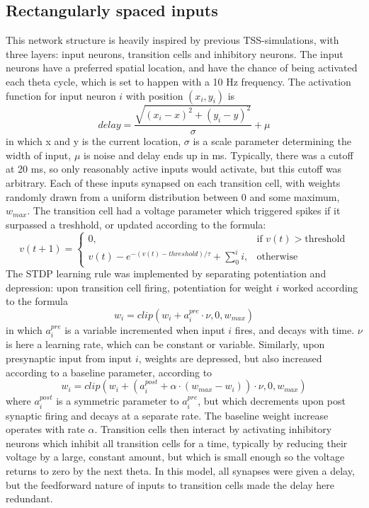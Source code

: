 \documentclass{article}
\begin{document}
    \subsection{Rectangularly spaced inputs} This network structure is heavily inspired by previous TSS-simulations, with three layers: input neurons, transition cells and inhibitory neurons. The input neurons have a preferred spatial location, and have the chance of being activated each theta cycle, which is set to happen with a 10 Hz frequency. The activation function for input neuron \(i\) with position \((x_i, y_i)\) is \begin{equation} \label{key1} delay = \frac{\sqrt{(x_i - x)^2 + (y_i - y)^2}}{\sigma} + \mu\end{equation}
    in which x and y is the current location, \(\sigma\) is a scale parameter determining the width of input, \(\mu\) is noise and delay ends up in ms. Typically, there was a cutoff at 20 ms, so only reasonably active inputs would activate, but this cutoff was arbitrary. Each of these inputs synapsed on each transition cell, with weights randomly drawn from a uniform distribution between 0 and some maximum, \(w_{max}\). The transition cell had a voltage parameter which triggered spikes if it surpassed a treshhold, or updated according to the formula: \begin{equation} \label{key2} v(t+1) =  \begin{cases} 0, & \text{if } v(t) > \text{threshold}\\ v(t) - e^{-(v(t) - threshold) / \tau} + \sum_{0}^{i} i, & \text{otherwise} \end{cases} \end{equation}
    The STDP learning rule was implemented by separating potentiation and depression: upon transition cell firing, potentiation for weight \(i\) worked according to the formula \begin{equation} \label{key3} w_i = clip(w_i + a^{pre}_i \cdot \nu, 0, w_{max})\end{equation} in which \(a^{pre}_i\) is a variable incremented when input \(i\) fires, and decays with time. \(\nu\) is here a learning rate, which can be constant or variable. 
    Similarly, upon presynaptic input from input \(i\), weights are depressed, but also increased according to a baseline parameter, according to \begin{equation} \label{key4} w_i = clip(w_i + (a^{post}_i + \alpha \cdot (w_{max}-w_i)) \cdot \nu, 0, w_{max})\end{equation} where \(a^{post}_i\) is a symmetric parameter to \(a^{pre}_i\), but which decrements upon post synaptic firing and decays at a separate rate. The baseline weight increase operates with rate \(\alpha\).
    Transition cells then interact by activating inhibitory neurons which inhibit all transition cells for a time, typically by reducing their voltage by a large, constant amount, but which is small enough so the voltage returns to zero by the next theta.
    In this model, all synapses were given a delay, but the feedforward nature of inputs to transition cells made the delay here redundant.
\end{document}

